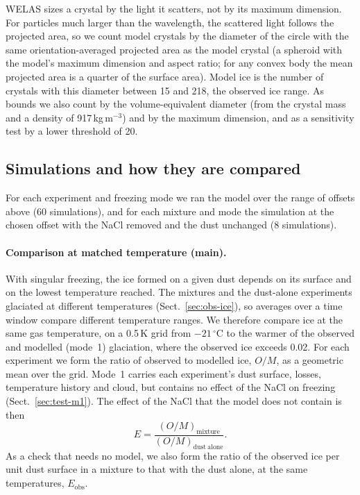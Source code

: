 WELAS sizes a crystal by the light it scatters, not by its maximum dimension. For particles much larger than the wavelength, the scattered light follows the projected area, so we count model crystals by the diameter of the circle with the same orientation-averaged projected area as the model crystal (a spheroid with the model's maximum dimension and aspect ratio; for any convex body the mean projected area is a quarter of the surface area). Model ice is the number of crystals with this diameter between 15 and 218\um, the observed ice range. As bounds we also count by the volume-equivalent diameter (from the crystal mass and a density of 917\,kg\,m$^{-3}$) and by the maximum dimension, and as a sensitivity test by a lower threshold of 20\um.

\subsection{Simulations and how they are compared}\label{sec:sims}

For each experiment and freezing mode we ran the model over the range of offsets above (60 simulations), and for each mixture and mode the simulation at the chosen offset with the NaCl removed and the dust unchanged (8 simulations).

\paragraph{Comparison at matched temperature (main).} With singular freezing, the ice formed on a given dust depends on its surface and on the lowest temperature reached. The mixtures and the dust-alone experiments glaciated at different temperatures (Sect.~\ref{sec:obs-ice}), so averages over a time window compare different temperature ranges. We therefore compare ice at the same gas temperature, on a 0.5\,K grid from $-21\,^\circ$C to the warmer of the observed and modelled (mode~1) glaciation, where the observed ice exceeds 0.02\cmc. For each experiment we form the ratio of observed to modelled ice, $O/M$, as a geometric mean over the grid. Mode~1 carries each experiment's dust surface, losses, temperature history and cloud, but contains no effect of the NaCl on freezing (Sect.~\ref{sec:test-m1}). The effect of the NaCl that the model does not contain is then
\begin{equation}
  E = \frac{(O/M)_\mathrm{mixture}}{(O/M)_\mathrm{dust\ alone}} .
  \label{eq:E}
\end{equation}
As a check that needs no model, we also form the ratio of the observed ice per unit dust surface in a mixture to that with the dust alone, at the same temperatures, $E_\mathrm{obs}$.

